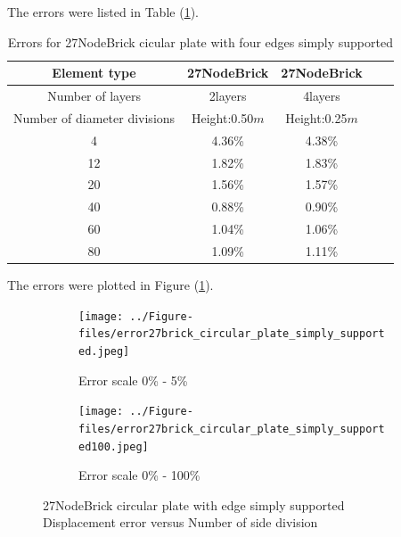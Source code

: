 \documentclass[fleqn,11pt]{article}
\begin{document}
The errors were listed in Table (\ref{table Errors for 27NodeBrick cicular plate with four edges simply supported}).

\begin{table}[H]
  \centering
  \caption{Errors for 27NodeBrick cicular plate with four edges simply supported}
  \label{table Errors for 27NodeBrick cicular plate with four edges simply supported}
  \begin{tabular}{|c|c|c|c|c|}
  \hline
  Element type     & 27NodeBrick     & 27NodeBrick      \\ \hline
  Number of layers      & 2layers         & 4layers          \\ \hline
  Number of diameter divisions & Height:0.50$m$ & Height:0.25$m$  \\ \hline
  4            & 4.36\% & 4.38\%      \\ \hline
  12           & 1.82\% & 1.83\%      \\ \hline
  20           & 1.56\% & 1.57\%      \\ \hline
  40           & 0.88\% & 0.90\%      \\ \hline
  60           & 1.04\% & 1.06\%      \\ \hline
  80           & 1.09\% & 1.11\%      \\
  \hline
  \end{tabular}
\end{table}


The errors were plotted in Figure (\ref{fig 27NodeBrick circular plate with four edge simply supported}).
\begin{figure}[H]
  \begin{subfigure}{0.5\textwidth}
    \centering
    \texttt{[image: ../Figure-files/error27brick\_circular\_plate\_simply\_supported.jpeg]}
    \caption{Error scale 0\% - 5\%}
  \end{subfigure}
  \begin{subfigure}{0.5\textwidth}
    \centering
    \texttt{[image: ../Figure-files/error27brick\_circular\_plate\_simply\_supported100.jpeg]}
    \caption{Error scale 0\% - 100\%}
  \end{subfigure}
  \captionsetup{justification=centering,margin=3cm}
  \caption{27NodeBrick circular plate with edge simply supported\\
      Displacement error   versus   Number of side division}
  \label{fig 27NodeBrick circular plate with four edge simply supported}
\end{figure}
\end{document}
